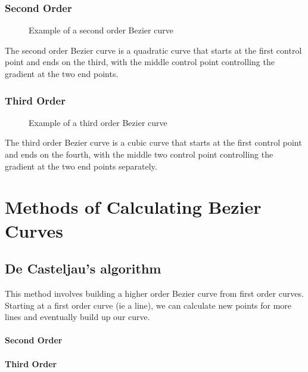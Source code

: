 \documentclass[a5paper,12pt]{book}
\begin{document}
\subsection{Second Order}
\begin{figure}[h]
    \centering
    
    \caption{Example of a second order Bezier curve} \label{fig:example-second}
\end{figure}
The second order Bezier curve is a quadratic curve that starts at the first control point and ends on the third, with the middle control point controlling the gradient at the two end points.
\subsection{Third Order}
\begin{figure}[h]
    \centering
    
    \caption{Example of a third order Bezier curve} \label{fig:example-third}
\end{figure}
The third order Bezier curve is a cubic curve that starts at the first control point and ends on the fourth, with the middle two control point controlling the gradient at the two end points separately.

\chapter{Methods of Calculating Bezier Curves}
\section{De Casteljau's algorithm}
This method involves building a higher order Bezier curve from first order curves.
Starting at a first order curve (ie a line), we can calculate new points for more lines and eventually build up our curve.
\subsubsection{Second Order}
\subsubsection{Third Order}

\clearpage
{}
\printindex
\end{document}
